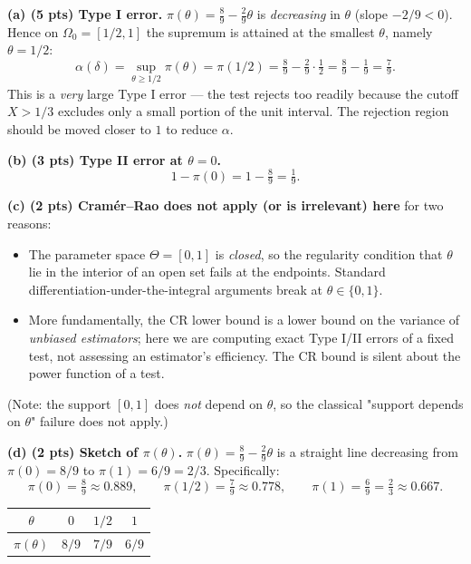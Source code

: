 \documentclass[11pt]{article}
\begin{document}
\textbf{(a) (5 pts) Type I error.}
$\pi(\theta) = \tfrac{8}{9} - \tfrac{2}{9}\theta$ is \emph{decreasing} in $\theta$ (slope $-2/9 < 0$). Hence on $\Omega_0 = [1/2, 1]$ the supremum is attained at the smallest $\theta$, namely $\theta = 1/2$:
\[
    \alpha(\delta) = \sup_{\theta \ge 1/2} \pi(\theta) = \pi(1/2) = \tfrac{8}{9} - \tfrac{2}{9}\cdot \tfrac{1}{2}
    = \tfrac{8}{9} - \tfrac{1}{9} = \tfrac{7}{9}.
\]
This is a \emph{very} large Type I error --- the test rejects too readily because the cutoff $X > 1/3$ excludes only a small portion of the unit interval. The rejection region should be moved closer to $1$ to reduce $\alpha$.

\textbf{(b) (3 pts) Type II error at $\theta = 0$.}
\[
    1 - \pi(0) = 1 - \tfrac{8}{9} = \tfrac{1}{9}.
\]

\textbf{(c) (2 pts) Cram\'er--Rao does not apply (or is irrelevant) here} for two reasons:
\begin{itemize}[leftmargin=2em, itemsep=0pt]
    \item The parameter space $\Theta = [0,1]$ is \emph{closed}, so the regularity condition that $\theta$ lie in the interior of an open set fails at the endpoints. Standard differentiation-under-the-integral arguments break at $\theta \in \{0, 1\}$.
    \item More fundamentally, the CR lower bound is a lower bound on the variance of \emph{unbiased estimators}; here we are computing exact Type I/II errors of a fixed test, not assessing an estimator's efficiency. The CR bound is silent about the power function of a test.
\end{itemize}
(Note: the support $[0,1]$ does \emph{not} depend on $\theta$, so the classical "support depends on $\theta$" failure does not apply.)

\textbf{(d) (2 pts) Sketch of $\pi(\theta)$.}
$\pi(\theta) = \tfrac{8}{9} - \tfrac{2}{9}\theta$ is a straight line decreasing from $\pi(0) = 8/9$ to $\pi(1) = 6/9 = 2/3$. Specifically:
\[
    \pi(0) = \tfrac{8}{9} \approx 0.889, \qquad \pi(1/2) = \tfrac{7}{9} \approx 0.778, \qquad \pi(1) = \tfrac{6}{9} = \tfrac{2}{3} \approx 0.667.
\]

\begin{center}
\begin{tabular}{c|ccc}
$\theta$ & $0$ & $1/2$ & $1$ \\
\hline
$\pi(\theta)$ & $8/9$ & $7/9$ & $6/9$ \\
\end{tabular}
\end{center}
\end{document}
